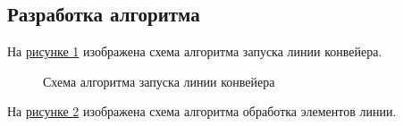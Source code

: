 \documentclass[14pt, a4paper]{extarticle}
\begin{document}
\subsection{Разработка алгоритма}
На \hyperref[Algorithm1]{рисунке 1} изображена схема алгоритма запуска линии конвейера.
\begin{figure}[h!]\label{Algorithm1}
	\caption{Схема алгоритма запуска линии конвейера}
\end{figure}
\clearpage
На \hyperref[Algorithm2]{рисунке 2} изображена схема алгоритма обработка элементов линии.
\end{document}
